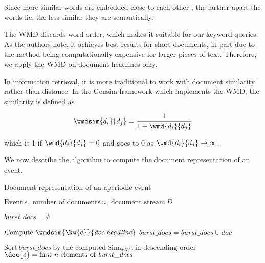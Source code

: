 Since more similar words are embedded close to each other \cite{linguistic-regularities}, the farther apart the words lie, the less similar they are semantically.

The WMD discards word order, which makes it suitable for our keyword queries. As the authors note, it achieves best results for short documents, in part due to the method being computationally expensive for larger pieces of text. Therefore, we apply the WMD on document headlines only.

In information retrieval, it is more traditional to work with document similarity rather than distance. In the Gensim framework \cite{gensim} which implements the WMD, the similarity is defined as

\begin{equation}
	\wmdsim{d_{i}}{d_{j}} = \frac{1}{1 + \wmd{d_{i}}{d_{j}}}
\end{equation}

which is 1 if $\wmd{d_{i}}{d_{j}} = 0$ and goes to 0 as $\wmd{d_{i}}{d_{j}} \to \infty$.

We now describe the algorithm to compute the document representation of an event.

\begin{algorithm}[H]
\begin{algorithmic}[1]
\caption{Document representation of an aperiodic event}
\Input $\text{Event}\ e,\ \text{number of documents}\ n,\ \text{document stream}\ D$

\State $\mathit{burst\_docs} = \emptyset$

		\State $\text{Compute}\ \wmdsim{\kw{e}}{\mathit{doc.headline}}$
		\State $\mathit{burst\_docs} = \mathit{burst\_docs} \cup \mathit{doc}$
	\EndIf
\EndFor

\State $\text{Sort}\ \mathit{burst\_docs}\ \text{by the computed}\ \text{Sim}_{\text{WMD}} \ \text{in descending order}$
\Output $\doc{e} = \text{first}\ n\ \text{elements of}\ \mathit{burst\_docs}$
\end{algorithmic}
\end{algorithm}